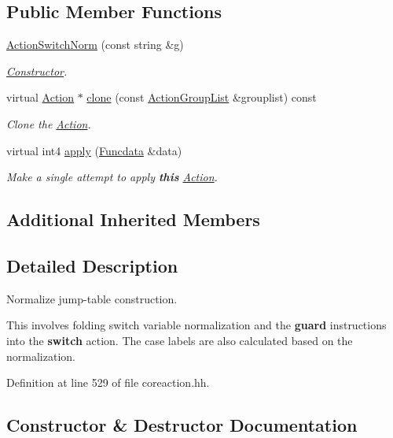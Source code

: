 \subsection*{Public Member Functions}
\begin{DoxyCompactItemize}
\item 
\mbox{\hyperlink{class_action_switch_norm_a7db627e235f195d28ddf1d447d2aff3d}{Action\+Switch\+Norm}} (const string \&g)
\begin{DoxyCompactList}\small\item\em \mbox{\hyperlink{class_constructor}{Constructor}}. \end{DoxyCompactList}\item 
virtual \mbox{\hyperlink{class_action}{Action}} $\ast$ \mbox{\hyperlink{class_action_switch_norm_a006f767268c4794b34b61face5a620cd}{clone}} (const \mbox{\hyperlink{class_action_group_list}{Action\+Group\+List}} \&grouplist) const
\begin{DoxyCompactList}\small\item\em Clone the \mbox{\hyperlink{class_action}{Action}}. \end{DoxyCompactList}\item 
virtual int4 \mbox{\hyperlink{class_action_switch_norm_afbafe42ea6a6c25321775656d0a1f6cb}{apply}} (\mbox{\hyperlink{class_funcdata}{Funcdata}} \&data)
\begin{DoxyCompactList}\small\item\em Make a single attempt to apply {\bfseries{this}} \mbox{\hyperlink{class_action}{Action}}. \end{DoxyCompactList}\end{DoxyCompactItemize}
\subsection*{Additional Inherited Members}


\subsection{Detailed Description}
Normalize jump-\/table construction. 

This involves folding switch variable normalization and the {\bfseries{guard}} instructions into the {\bfseries{switch}} action. The case labels are also calculated based on the normalization. 

Definition at line 529 of file coreaction.\+hh.



\subsection{Constructor \& Destructor Documentation}
\mbox{\label{class_action_switch_norm_a7db627e235f195d28ddf1d447d2aff3d}} 
